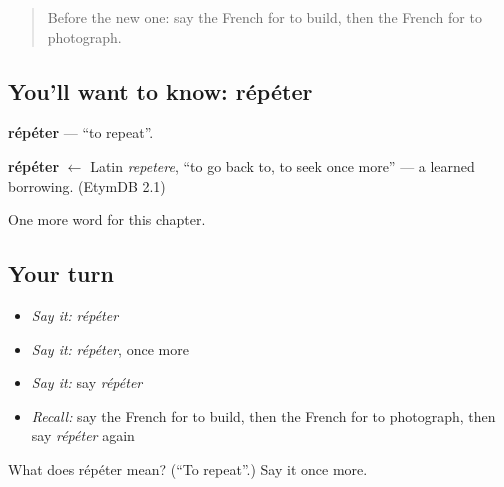\label{lesson:FR-C233-repeter}



\begin{quote}
Before the new one: say the French for to build, then the French for to photograph.
\end{quote}

\subsection*{You'll want to know: répéter}
\textbf{répéter} — \textquotedblleft{}to repeat\textquotedblright{}.

\begin{cousinweb}
\textbf{répéter} $\leftarrow$ Latin \emph{repetere}, \textquotedblleft{}to go back to, to seek once more\textquotedblright{} — a learned borrowing. (EtymDB 2.1)
\end{cousinweb}

\begin{grammarlens}[title={What you've built}]
One more word for this chapter.
\end{grammarlens}

\subsection*{Your turn}
\begin{itemize}
\raggedright
  \item \emph{Say it:} \emph{répéter}
  \item \emph{Say it:} \emph{répéter}, once more
  \item \emph{Say it:} say \emph{répéter}
  \item \emph{Recall:} say the French for to build, then the French for to photograph, then say \emph{répéter} again
\end{itemize}

\begin{tcolorbox}[breakable,colback=teal!4,colframe=teal!35!black,title={Before you move on}]
What does répéter mean? (\textquotedblleft{}To repeat\textquotedblright{}.) Say it once more.
\end{tcolorbox}
